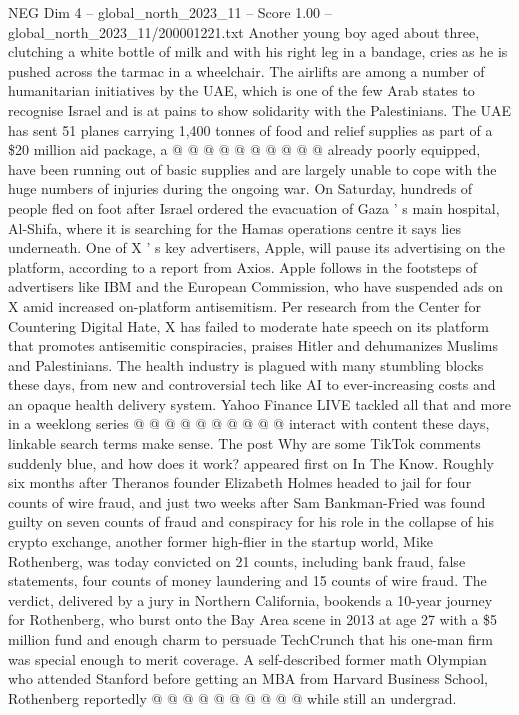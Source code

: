 \begin{textsample}{NEG Dim 4 – global\_north\_2023\_11 – Score 1.00 – global\_north\_2023\_11/200001221.txt}
Another young boy aged about three, clutching a white bottle of milk and with his right leg in a bandage, cries as he is pushed across the tarmac in a wheelchair.
The airlifts are among a number of humanitarian initiatives by the UAE, which is one of the few Arab states to recognise Israel and is at pains to show solidarity with the Palestinians.
The UAE has sent 51 planes carrying 1,400 tonnes of food and relief supplies as part of a \$20 million aid package, a @ @ @ @ @ @ @ @ @ @ already poorly equipped, have been running out of basic supplies and are largely unable to cope with the huge numbers of injuries during the ongoing war.
On Saturday, hundreds of people fled on foot after Israel ordered the evacuation of Gaza ' s main hospital, Al-Shifa, where it is searching for the Hamas operations centre it says lies underneath.
One of X ' s key advertisers, Apple, will pause its advertising on the platform, according to a report from Axios.
Apple follows in the footsteps of advertisers like IBM and the European Commission, who have suspended ads on X amid increased on-platform antisemitism.
Per research from the Center for Countering Digital Hate, X has failed to moderate hate speech on its platform that promotes antisemitic conspiracies, praises Hitler and dehumanizes Muslims and Palestinians.
The health industry is plagued with many stumbling blocks these days, from new and controversial tech like AI to ever-increasing costs and an opaque health delivery system.
Yahoo Finance LIVE tackled all that and more in a weeklong series @ @ @ @ @ @ @ @ @ @ interact with content these days, linkable search terms make sense.
The post Why are some TikTok comments suddenly blue, and how does it work? appeared first on In The Know.
Roughly six months after Theranos founder Elizabeth Holmes headed to jail for four counts of wire fraud, and just two weeks after Sam Bankman-Fried was found guilty on seven counts of fraud and conspiracy for his role in the collapse of his crypto exchange, another former high-flier in the startup world, Mike Rothenberg, was today convicted on 21 counts, including bank fraud, false statements, four counts of money laundering and 15 counts of wire fraud.
The verdict, delivered by a jury in Northern California, bookends a 10-year journey for Rothenberg, who burst onto the Bay Area scene in 2013 at age 27 with a \$5 million fund and enough charm to persuade TechCrunch that his one-man firm was special enough to merit coverage.
A self-described former math Olympian who attended Stanford before getting an MBA from Harvard Business School, Rothenberg reportedly @ @ @ @ @ @ @ @ @ @ while still an undergrad.

\end{textsample}
